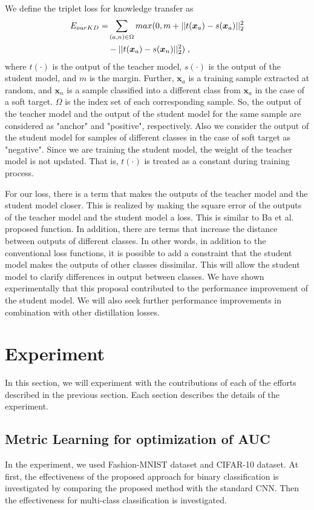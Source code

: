 \documentclass[twocolumn,10pt]{article}
\begin{document}
We define the triplet loss for knowledge transfer as
\begin{align}
    E_{ourKD} = &\sum_{(a,n) \in \Omega} max(0, m + ||t({\bm x_a}) - s({\bm x_a})||_2^2 \notag \\ 
    &- ||t({\bm x_a}) - s({\bm x_n})||_2^2) \; ,
\end{align}
where $t(\cdot)$ is the output of the teacher model, $s(\cdot)$ is the output of the student model, and $m$ is the margin.
Further, ${\bm x_a}$ is a training sample extracted at random, and ${\bm x_n}$ is a sample classified into a different class from ${\bm x_a}$ in the case of a soft target.
$\Omega$ is the index set of each corresponding sample.
So, the output of the teacher model and the output of the student model for the same sample are considered as "anchor" and "positive", respectively.
Also we consider the output of the student model for samples of different classes in the case of soft target as "negative".
Since we are training the student model, the weight of the teacher model is not updated.
That is, $t(\cdot)$ is treated as a constant during training process.

For our loss, there is a term that makes the outputs of the teacher model and the student model closer. 
This is realized by making the square error of the outputs of the teacher model and the student model a loss.
This is similar to Ba et al. \cite{Ba2014} proposed function.
In addition, there are terms that increase the distance between outputs of different classes.
In other words, in addition to the conventional loss functions, it is possible to add a constraint that the student model makes the outputs of other classes dissimilar.
This will allow the student model to clarify differences in output between classes.
We have shown experimentally that this proposal contributed to the performance improvement of the student model.
We will also seek further performance improvements in combination with other distillation losses.

\thispagestyle{empty}
\section{Experiment}
In this section, we will experiment with the contributions of each of the efforts described in the previous section.
Each section describes the details of the experiment.
\subsection{Metric Learning for optimization of AUC}
In the experiment, we used Fashion-MNIST \cite{Xiao2017} dataset and CIFAR-10 \cite{Krizhevsky2009} dataset.
At first, the effectiveness of the proposed approach for binary classification is investigated by comparing the proposed method with the standard CNN. Then the effectiveness for multi-class classification is investigated.
\end{document}
